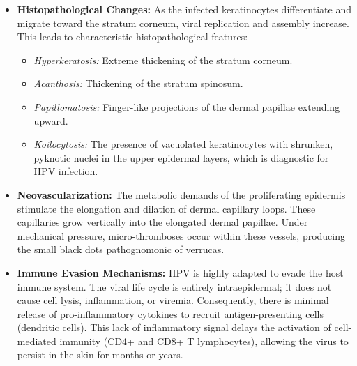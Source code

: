 \begin{itemize}
    \item \textbf{Histopathological Changes:} As the infected keratinocytes differentiate and migrate toward the stratum corneum, viral replication and assembly increase. This leads to characteristic histopathological features:
    \begin{itemize}
        \item \textit{Hyperkeratosis:} Extreme thickening of the stratum corneum.
        \item \textit{Acanthosis:} Thickening of the stratum spinosum.
        \item \textit{Papillomatosis:} Finger-like projections of the dermal papillae extending upward.
        \item \textit{Koilocytosis:} The presence of vacuolated keratinocytes with shrunken, pyknotic nuclei in the upper epidermal layers, which is diagnostic for HPV infection.
    \end{itemize}
    \item \textbf{Neovascularization:} The metabolic demands of the proliferating epidermis stimulate the elongation and dilation of dermal capillary loops. These capillaries grow vertically into the elongated dermal papillae. Under mechanical pressure, micro-thromboses occur within these vessels, producing the small black dots pathognomonic of verrucas.
    \item \textbf{Immune Evasion Mechanisms:} HPV is highly adapted to evade the host immune system. The viral life cycle is entirely intraepidermal; it does not cause cell lysis, inflammation, or viremia. Consequently, there is minimal release of pro-inflammatory cytokines to recruit antigen-presenting cells (dendritic cells). This lack of inflammatory signal delays the activation of cell-mediated immunity (CD4+ and CD8+ T lymphocytes), allowing the virus to persist in the skin for months or years.
\end{itemize}

